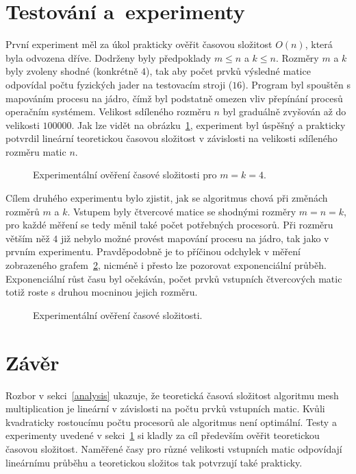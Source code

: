 \documentclass[a4paper, 12pt]{article}[24.4.2015]
\begin{document}
\section{Testování a~experimenty} \label{experiments}
První experiment měl za úkol prakticky ověřit časovou složitost \(O(n)\), která byla odvozena dříve. Dodrženy byly předpoklady \(m \leq n\) a \(k \leq n\). Rozměry \(m\) a \(k\) byly zvoleny shodné (konkrétně \(4\)), tak aby počet prvků výsledné matice odpovídal počtu fyzických jader na testovacím stroji (\(16\)). Program byl spouštěn s mapováním procesu na jádro, čímž byl podstatně omezen vliv přepínání procesů operačním systémem. Velikost sdíleného rozměru \(n\) byl graduálně zvyšován až do velikosti \(100000\). Jak lze vidět na obrázku~\ref{fig:measurement_n}, experiment byl úspěšný a prakticky potvrdil lineární teoretickou časovou složitost v závislosti na velikosti sdíleného rozměru matic \(n\).
\begin{figure}
\centering

\caption{Experimentální ověření časové složitosti pro \(m = k = 4\).}
\label{fig:measurement_n}
\end{figure}

Cílem druhého experimentu bylo zjistit, jak se algoritmus chová při změnách rozměrů \(m\) a \(k\). Vstupem byly čtvercové matice se shodnými rozměry \(m = n = k\), pro každé měření se tedy měnil také počet potřebných procesorů. Při rozměru větším něž \(4\) již nebylo možné provést mapování procesu na jádro, tak jako v prvním experimentu. Pravděpodobně je to příčinou odchylek v měření zobrazeného grafem~\ref{fig:measurement_mk}, nicméně i přesto lze pozorovat exponenciální průběh. Exponenciální růst času byl očekáván, počet prvků vstupních čtvercových matic totiž roste s druhou mocninou jejich rozměru.
\begin{figure}
\centering

\caption{Experimentální ověření časové složitosti.}
\label{fig:measurement_mk}
\end{figure}

\section{Závěr}\label{conclusion}
Rozbor v sekci~\ref{analysis} ukazuje, že teoretická časová složitost algoritmu mesh multiplication je lineární v závislosti na počtu prvků vstupních matic. Kvůli kvadraticky rostoucímu počtu procesorů ale algoritmus není optimální. Testy a experimenty uvedené v sekci~\ref{experiments} si kladly za cíl především ověřit teoretickou časovou složitost. Naměřené časy pro různé velikosti vstupních matic odpovídají lineárnímu průběhu a teoretickou složitos tak potvrzují také prakticky.
\end{document}
